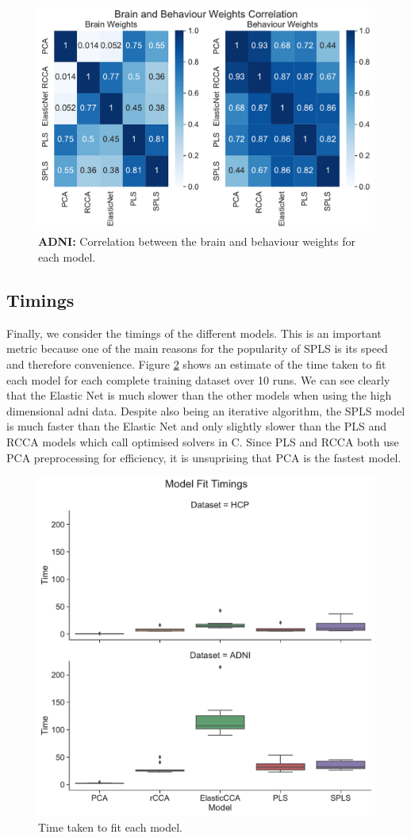 \begin{figure}
    \centering
    \includegraphics[width=0.8\linewidth]{figures/adni/brain and behaviour weights correlation}
    \caption{\textbf{ADNI:} Correlation between the brain and behaviour \gls{weights} for each model.}\label{fig:brain-behaviour-weights-sim-adni}
\end{figure}

\subsection{Timings}

Finally, we consider the timings of the different models.
This is an important metric because one of the main reasons for the popularity of SPLS is its speed and therefore convenience.
Figure \ref{fig:timings} shows an estimate of the time taken to fit each model for each complete training dataset over 10 runs.
We can see clearly that the Elastic Net is much slower than the other models when using the high dimensional \acrshort{adni} data.
Despite also being an iterative algorithm, the SPLS model is much faster than the Elastic Net and only slightly slower than the PLS and RCCA models which call optimised solvers in C.
Since PLS and RCCA both use PCA preprocessing for efficiency, it is unsuprising that PCA is the fastest model.

\begin{figure}
    \centering
    \includegraphics[width=0.45\linewidth]{figures/model_fit_timings}
    \caption{Time taken to fit each model.}\label{fig:timings}
\end{figure}

